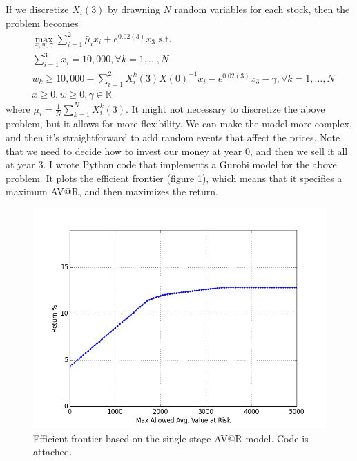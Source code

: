 \documentclass{amsart}
\theoremstyle{definition}
\theoremstyle{remark}
\begin{document}
If we discretize $X_i(3)$ by drawning $N$ random variables for each stock, then the problem becomes
\begin{align*}
&\max_{x,w,\gamma} \sum_{i=1}^2 \bar{\mu}_i x_i +  e^{0.02(3)} x_3 \text{ s.t.}\\
&\sum_{i=1}^3 x_i = 10,000,  \forall k = 1,\ldots, N\\
& w_k \ge 10,000 - \sum_{i=1}^2 X^k_i(3) X(0)^{-1} x_i - e^{0.02(3)} x_3 - \gamma, \forall k = 1,\ldots, N\\
&x \ge 0, w \ge 0, \gamma \in \mathbb{R}
\end{align*}
where $\bar{\mu}_i = \frac{1}{N} \sum_{k=1}^N X_i^k(3)$.
It might not necessary to discretize the above problem, but it allows for more flexibility. We can make the model more complex, and then it's straightforward to add random events that affect the prices. Note that we need to decide how to invest our money at year 0, and then we sell it all at year 3. I wrote Python code that implements a Gurobi model for the above problem. It plots the efficient frontier (figure \ref{fig:single_stage}), which means that it specifies a maximum AV@R, and then maximizes the return.
\begin{figure}
\centering
\includegraphics[scale=0.5]{single_stage.png}
\caption{Efficient frontier based on the single-stage AV@R model.  Code is attached.}
\label{fig:single_stage}
\end{figure}
\end{document}
